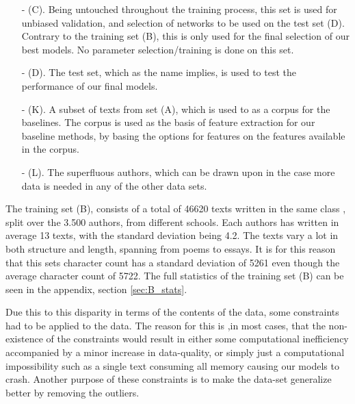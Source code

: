 \begin{itemize}
\begin{itemize}
\begin{itemize}
\end{itemize}


\item[- (C).] 
Being untouched throughout the training process, this set is used for unbiased
validation, and selection of networks to be used on the test set (D). Contrary
to the training set (B), this is only used for the final selection of our best 
models. No parameter selection/training is done on this set.


\item[- (D).] 
The test set, which as the name implies, is used to test the
performance of our final models.

\item[- (K).]
A subset of texts from set (A),  which is used to as a corpus for the baselines.
The corpus is used as the basis of feature extraction for our baseline methods,
by basing the options for features on the features available in the corpus.

\item[- (L).]
The superfluous authors, which can be drawn upon in the case more data is needed
in any of the other data sets.

\end{itemize}



\end{itemize}


The training set (B), consists of a total of 46620 texts written in the same
class , split over the 3.500 authors, from different schools. Each authors has
written in average 13 texts, with the standard deviation being 4.2. The texts
vary a lot in both structure and length, spanning from poems to essays. It is
for this reason that this sets character count has a standard deviation of 5261
even though the average character count of 5722. The full statistics of the
training set (B) can be seen in the appendix, section \ref{sec:B_stats}.

Due this to this disparity in terms of the contents of the data, some
constraints had to be applied to the data. The reason for this is ,in most
cases, that the non-existence of the constraints would result in either some
computational inefficiency accompanied by a minor increase in data-quality, or
simply just a computational impossibility such as a single text consuming all
memory causing our models to crash. Another purpose of these constraints 
is to make the data-set generalize better by removing the outliers.

